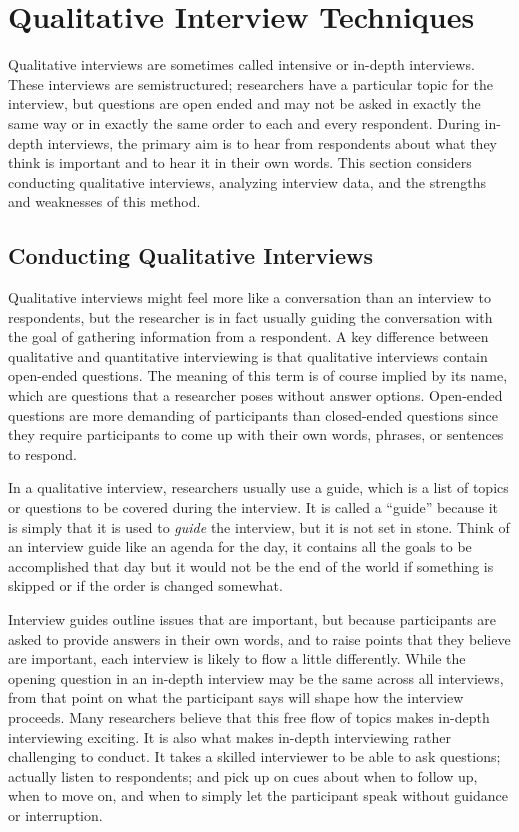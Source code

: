 \section{Qualitative Interview Techniques}

Qualitative interviews are sometimes called intensive or in-depth interviews. These interviews are semistructured; researchers have a particular topic for the interview, but questions are open ended and may not be asked in exactly the same way or in exactly the same order to each and every respondent. During in-depth interviews, the primary aim is to hear from respondents about what they think is important and to hear it in their own words. This section considers conducting qualitative interviews, analyzing interview data, and the strengths and weaknesses of this method.

\subsection{Conducting Qualitative Interviews}

Qualitative interviews might feel more like a conversation than an interview to respondents, but the researcher is in fact usually guiding the conversation with the goal of gathering information from a respondent. A key difference between qualitative and quantitative interviewing is that qualitative interviews contain open-ended questions. The meaning of this term is of course implied by its name, which are questions that a researcher poses without answer options. Open-ended questions are more demanding of participants than closed-ended questions since they require participants to come up with their own words, phrases, or sentences to respond.

In a qualitative interview, researchers usually use a guide, which is a list of topics or questions to be covered during the interview. It is called a ``guide'' because it is simply that \emdash it is used to \textit{guide} the interview, but it is not set in stone. Think of an interview guide like an agenda for the day, it contains all the goals to be accomplished that day but it would not be the end of the world if something is skipped or if the order is changed somewhat. 

Interview guides outline issues that are important, but because participants are asked to provide answers in their own words, and to raise points that they believe are important, each interview is likely to flow a little differently. While the opening question in an in-depth interview may be the same across all interviews, from that point on what the participant says will shape how the interview proceeds. Many researchers believe that this free flow of topics makes in-depth interviewing exciting. It is also what makes in-depth interviewing rather challenging to conduct. It takes a skilled interviewer to be able to ask questions; actually listen to respondents; and pick up on cues about when to follow up, when to move on, and when to simply let the participant speak without guidance or interruption.

